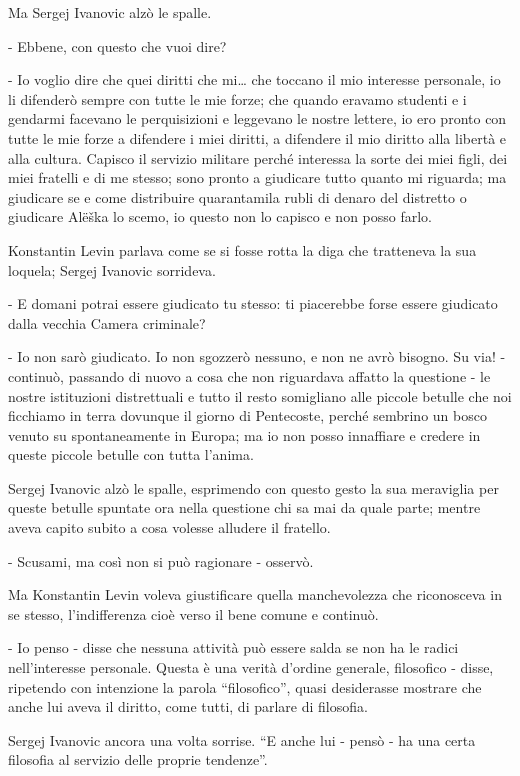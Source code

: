 Ma Sergej Ivanovic alzò le spalle. 

- Ebbene, con questo che vuoi dire? 

- Io voglio dire che quei diritti che mi\ldots{} che toccano il mio interesse personale, io li difenderò sempre con tutte le mie forze; che quando eravamo studenti e i gendarmi facevano le perquisizioni e leggevano le nostre lettere, io ero pronto con tutte le mie forze a difendere i miei diritti, a difendere il mio diritto alla libertà e alla cultura. Capisco il servizio militare perché interessa la sorte dei miei figli, dei miei fratelli e di me stesso; sono pronto a giudicare tutto quanto mi riguarda; ma giudicare se e come distribuire quarantamila rubli di denaro del distretto o giudicare Alëška lo scemo, io questo non lo capisco e non posso farlo. 

Konstantin Levin parlava come se si fosse rotta la diga che tratteneva la sua loquela; Sergej Ivanovic sorrideva. 

- E domani potrai essere giudicato tu stesso: ti piacerebbe forse essere giudicato dalla vecchia Camera criminale? 

- Io non sarò giudicato. Io non sgozzerò nessuno, e non ne avrò bisogno. Su via! - continuò, passando di nuovo a cosa che non riguardava affatto la questione - le nostre istituzioni distrettuali e tutto il resto somigliano alle piccole betulle che noi ficchiamo in terra dovunque il giorno di Pentecoste, perché sembrino un bosco venuto su spontaneamente in Europa; ma io non posso innaffiare e credere in queste piccole betulle con tutta l'anima. 

Sergej Ivanovic alzò le spalle, esprimendo con questo gesto la sua meraviglia per queste betulle spuntate ora nella questione chi sa mai da quale parte; mentre aveva capito subito a cosa volesse alludere il fratello. 

- Scusami, ma così non si può ragionare - osservò. 

Ma Konstantin Levin voleva giustificare quella manchevolezza che riconosceva in se stesso, l'indifferenza cioè verso il bene comune e continuò. 

- Io penso - disse che nessuna attività può essere salda se non ha le radici nell'interesse personale. Questa è una verità d'ordine generale, filosofico - disse, ripetendo con intenzione la parola ``filosofico'', quasi desiderasse mostrare che anche lui aveva il diritto, come tutti, di parlare di filosofia. 

Sergej Ivanovic ancora una volta sorrise. ``E anche lui - pensò - ha una certa filosofia al servizio delle proprie tendenze''. 

